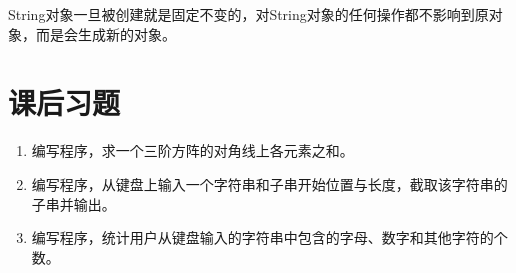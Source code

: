 
String对象一旦被创建就是固定不变的，对String对象的任何操作都不影响到原对象，而是会生成新的对象。



\section{课后习题}


\begin{enumerate}
\item 编写程序，求一个三阶方阵的对角线上各元素之和。
\item 编写程序，从键盘上输入一个字符串和子串开始位置与长度，截取该字符串的子串并输出。
\item 编写程序，统计用户从键盘输入的字符串中包含的字母、数字和其他字符的个数。
\end{enumerate}